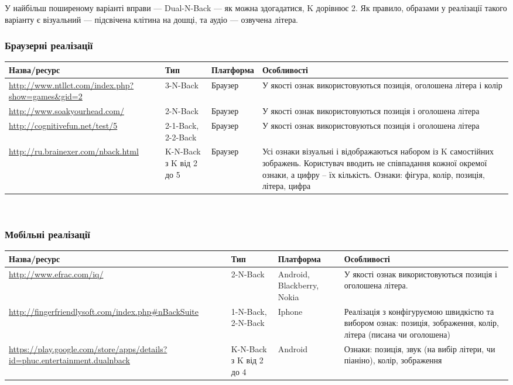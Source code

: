 У найбільш поширеному варіанті вправи — Dual-N-Back — як можна здогадатися, K дорівнює 2. Як правило, образами у реалізації такого варіанту є візуальний — підсвічена клітина на дошці, та аудіо — озвучена літера.

\subsubsection{Браузерні реалізації}
\small\begin{longtable}{| C{5cm} | C{2cm} | C{2.5cm} | C{5cm} |}
  \hline
  Назва/ресурс & Тип & Платформа & Особливості \\
  \hline
  \url{http://www.ntllct.com/index.php?show=games\&gid=2}
  & 3-N-Back
  & Браузер
  & У якості ознак використовуються позиція, оголошена літера і колір \\
  \hline
  \url{http://www.soakyourhead.com/}
  & 2-N-Back
  & Браузер
  & У якості ознак використовуються позиція і оголошена літера \\
  \hline
  \url{http://cognitivefun.net/test/5}
  & 2-1-Back, 2-2-Back
  & Браузер
  & У якості ознак використовуються позиція і оголошена літера \\
  \hline
  \url{http://ru.brainexer.com/nback.html}
  & K-N-Back з K від 2 до 5
  & Браузер
  & Усі ознаки візуальні і відображаються набором із K самостійних зображень.
  Користувач вводить не співпадання кожної окремої ознаки, а цифру – їх кількість.
  Ознаки: фігура, колір, позиція, літера, цифра \\
  \hline
\end{longtable}\normalsize
~\newline
\subsubsection{Мобільні реалізації}
\small\begin{longtable}{| C{5cm} | C{2cm} | C{2.5cm} | C{5cm} |}
  \hline
  Назва/ресурс & Тип & Платформа & Особливості \\
  \hline
  \url{http://www.efrac.com/iq/}
  & 2-N-Back
  & Android, Blackberry, Nokia
  & У якості ознак використовуються позиція і оголошена літера. \\
  \hline
  \url{http://fingerfriendlysoft.com/index.php#nBackSuite}
  & 1-N-Back, 2-N-Back
  & Iphone
  & Реалізація з конфігуруємою швидкістю та вибором ознак:
  позиція, зображення, колір, літера (писана чи оголошена) \\
  \hline
  \url{https://play.google.com/store/apps/details?id=phuc.entertainment.dualnback}
  & K-N-Back з K від 2 до 4
  & Android
  & Ознаки: позиція, звук (на вибір літери, чи піаніно), колір, зображення \\
  \hline
\end{longtable}\normalsize
~\newline

